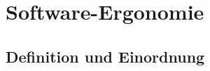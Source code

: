 %
%
%
%
%
%

\section{Software-Ergonomie}
\label{sec:software-ergonomie}

\subsection{Definition und Einordnung}
\label{sec:software-ergonomie:Definition und Einordnung}

